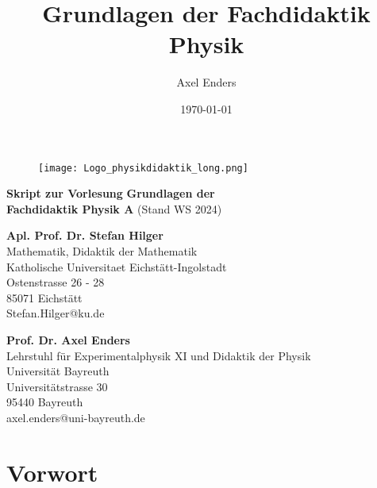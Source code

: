 \documentclass[11pt,a4paper]{book}
\title{Grundlagen der Fachdidaktik Physik}
\author{Axel Enders}
\date{\today}
\begin{document}
\begin{titlepage}
	\vs{0.5cm}
	\begin{figure}[h]
	\centering
	\texttt{[image: Logo\_physikdidaktik\_long.png]}
	\label{fig:Logo}
	\end{figure}
	
	\vs{1cm}
	\begin{center}
	\Large \textbf{Skript zur Vorlesung}
	\bip\bip
	\Huge \textbf{Grundlagen der \\ Fachdidaktik  Physik A}
	\bip\bip
	\Large
	(Stand WS 2024)
	\end{center}

	\vs{6cm}

	\begin{flushright}
		\textbf{Apl. Prof. Dr. Stefan Hilger} \\
			Mathematik, Didaktik der Mathematik  \\
			Katholische Universitaet Eichst\"att-Ingolstadt \\
			Ostenstrasse 26 - 28  \\
			85071 Eichst\"att \\
			Stefan.Hilger@ku.de \\

	\vs{0.5cm}

		\textbf{Prof. Dr. Axel Enders} \\
		Lehrstuhl f\"ur Experimentalphysik XI und Didaktik der Physik  \\
		Universit\"at Bayreuth  \\
		Universit\"atstrasse 30  \\
		95440 Bayreuth  \\
		axel.enders@uni-bayreuth.de
	\end{flushright}

\end{titlepage}

\newpage

\vs{3cm}
\section*{Vorwort}
\end{document}
